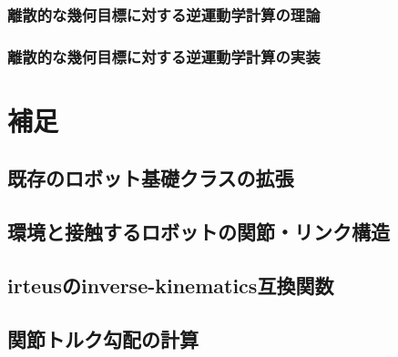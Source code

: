 \documentclass[]{jarticle}
\begin{document}
\subsubsection{離散的な幾何目標に対する逆運動学計算の理論}

\subsubsection{離散的な幾何目標に対する逆運動学計算の実装}


\section{補足} \label{chap:appendix}
\subsection{既存のロボット基礎クラスの拡張} \label{sec:base-extention}

\subsection{環境と接触するロボットの関節・リンク構造} \label{sec:robot-environment}


\subsection{irteusのinverse-kinematics互換関数} \label{sec:ik-wrapper}

\subsection{関節トルク勾配の計算} \label{sec:torque-jacobian}

\end{document}
